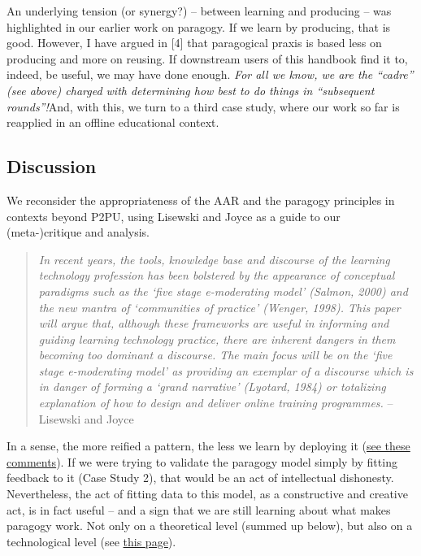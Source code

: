 An underlying tension (or synergy?) -- between learning and producing --
was highlighted in our earlier work on paragogy. If we learn by
producing, that is good. However, I have argued in {[}4{]} that
paragogical praxis is based less on producing and more on reusing. If
downstream users of this handbook find it to, indeed, be useful, we may
have done enough. \emph{For all we know, we are the ``cadre'' (see
above) charged with determining how best to do things in ``subsequent
rounds''!}And, with this, we turn to a third case study, where our work
so far is reapplied in an offline educational context.

\subsection{Discussion}

We reconsider the appropriateness of the AAR and the paragogy principles
in contexts beyond P2PU, using Lisewski and Joyce as a guide to our
(meta-)critique and analysis.

\begin{quote}
\emph{In recent years, the tools, knowledge base and discourse of the
learning technology profession has been bolstered by the appearance of
conceptual paradigms such as the `five stage e-moderating model'
(Salmon, 2000) and the new mantra of `communities of practice' (Wenger,
1998). This paper will argue that, although these frameworks are useful
in informing and guiding learning technology practice, there are
inherent dangers in them becoming too dominant a discourse. The main
focus will be on the `five stage e-moderating model' as providing an
exemplar of a discourse which is in danger of forming a `grand
narrative' (Lyotard, 1984) or totalizing explanation of how to design
and deliver online training programmes.} -- Lisewski and Joyce

\end{quote}
In a sense, the more reified a pattern, the less we learn by deploying
it
(\href{http://socialmediaclassroom.com/host/peeragogy/forum/anti-patterns-concerns-complaints-and-critiques\#comment-2355}{see
these comments}). If we were trying to validate the paragogy model
simply by fitting feedback to it (Case Study 2), that would be an act of
intellectual dishonesty. Nevertheless, the act of fitting data to this
model, as a constructive and creative act, is in fact useful -- and a
sign that we are still learning about what makes paragogy work. Not only
on a theoretical level (summed up below), but also on a technological
level (see
\href{http://socialmediaclassroom.com/host/peeragogy/wiki/researching-p\%C3\%A6ragogy}{this
page}).

